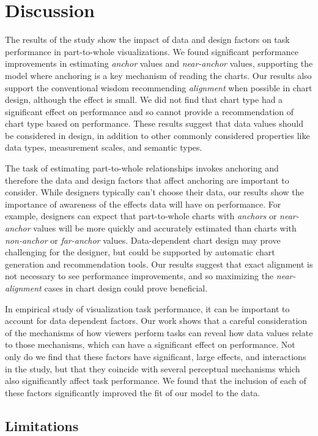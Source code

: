 \documentclass[preprint]{vgtc}               %
\begin{document}
\section{Discussion}
The results of the study show the impact of data and design factors on task performance in part-to-whole visualizations.
We found significant performance improvements in estimating \emph{anchor} values and \emph{near-anchor} values, supporting the model where anchoring is a key mechanism of reading the charts.
Our results also support the conventional wisdom recommending \emph{alignment} when possible in chart design, although the effect is small.
We did not find that chart type had a significant effect on performance and so cannot provide a recommendation of chart type based on performance.
These results suggest that data values should be considered in design, in addition to other commonly considered properties like data types, measurement scales, and semantic types.

The task of estimating part-to-whole relationships invokes anchoring and therefore the data and design factors that affect anchoring are important to consider.
While designers typically can't choose their data, our results show the importance of awareness of the effects data will have on performance.
For example, designers can expect that part-to-whole charts with \emph{anchors} or \emph{near-anchor} values will be more quickly and accurately estimated than charts with \emph{non-anchor} or \emph{far-anchor} values.
Data-dependent chart design may prove challenging for the designer, but could be supported by automatic chart generation and recommendation tools.
Our results suggest that exact alignment is not necessary to see performance improvements, and so maximizing the \emph{near-alignment} cases in chart design could prove beneficial.

In empirical study of visualization task performance, it can be important to account for data dependent factors.
Our work shows that a careful consideration of the mechanisms of how viewers perform tasks can reveal how data values relate to those mechanisms, which can have a significant effect on  performance.
Not only do we find that these factors have significant, large effects, and interactions in the study, but that they coincide with several perceptual mechanisms which also significantly affect task performance. 
We found that the inclusion of each of these factors significantly improved the fit of our model to the data.

\subsection{Limitations}
\label{sec:limitations}
\end{document}
